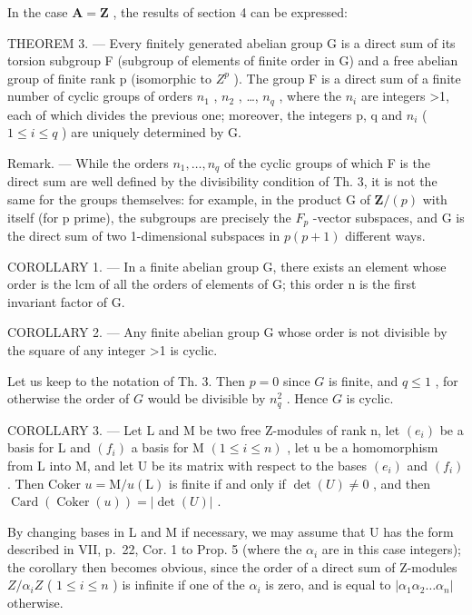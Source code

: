 In the case \(\mathbf{A} = \mathbf{Z}\) , the results of section 4 can be expressed:

THEOREM 3. --- Every finitely generated abelian group G is a direct sum of its torsion subgroup F (subgroup of elements of finite order in G) and a free abelian group of finite rank p (isomorphic to \(Z^{p}\) ). The group F is a direct sum of a finite number of cyclic groups of orders \(n_{1}\) , \(n_{2}\) , \ldots, \(n_{q}\) , where the \(n_{i}\) are integers \textgreater1, each of which divides the previous one; moreover, the integers p, q and \(n_{i}\) ( \(1 \leq i \leq q\) ) are uniquely determined by G.

Remark. --- While the orders \(n_{1}, \ldots, n_{q}\) of the cyclic groups of which F is the direct sum are well defined by the divisibility condition of Th. 3, it is not the same for the groups themselves: for example, in the product G of \(\mathbf{Z}/(p)\) with itself (for p prime), the subgroups are precisely the \(F_{p}\) -vector subspaces, and G is the direct sum of two 1-dimensional subspaces in \(p(p+1)\) different ways.

COROLLARY 1. --- In a finite abelian group G, there exists an element whose order is the lcm of all the orders of elements of G; this order n is the first invariant factor of G.

COROLLARY 2. --- Any finite abelian group G whose order is not divisible by the square of any integer \textgreater1 is cyclic.

Let us keep to the notation of Th. 3. Then \(p = 0\) since \(G\) is finite, and \(q \leqslant 1\) , for otherwise the order of \(G\) would be divisible by \(n_q^2\) . Hence \(G\) is cyclic.

COROLLARY 3. --- Let L and M be two free Z-modules of rank n, let \((e_{i})\) be a basis for L and \((f_{i})\) a basis for M \((1 \leqslant i \leqslant n)\) , let u be a homomorphism from L into M, and let U be its matrix with respect to the bases \((e_{i})\) and \((f_{i})\) . Then Coker \(u = \mathrm{M}/u(\mathrm{L})\) is finite if and only if \(\det(U) \neq 0\) , and then \(\operatorname{Card}(\operatorname{Coker}(u)) = |\det(U)|\) .

By changing bases in L and M if necessary, we may assume that U has the form described in VII, p.~22, Cor. 1 to Prop. 5 (where the \(\alpha_{i}\) are in this case integers); the corollary then becomes obvious, since the order of a direct sum of Z-modules \(Z/\alpha_{i}Z\) ( \(1 \leqslant i \leqslant n\) ) is infinite if one of the \(\alpha_{i}\) is zero, and is equal to \(|\alpha_{1}\alpha_{2} \ldots \alpha_{n}|\) otherwise.

